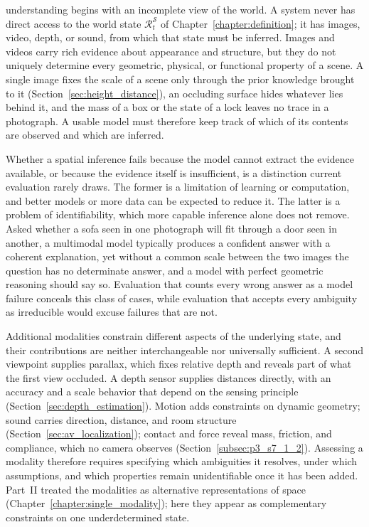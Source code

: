  understanding begins with an incomplete view of the world.
A system never has direct access to the world state $\mathcal{R}^{\mathcal{S}}_t$ of Chapter~\ref{chapter:definition}; it has images, video, depth, or sound, from which that state must be inferred.
Images and videos carry rich evidence about appearance and structure, but they do not uniquely determine every geometric, physical, or functional property of a scene.
A single image fixes the scale of a scene only through the prior knowledge brought to it (Section~\ref{sec:height_distance}), an occluding surface hides whatever lies behind it, and the mass of a box or the state of a lock leaves no trace in a photograph.
A usable model must therefore keep track of which of its contents are observed and which are inferred.

Whether a spatial inference fails because the model cannot extract the evidence available, or because the evidence itself is insufficient, is a distinction current evaluation rarely draws.
The former is a limitation of learning or computation, and better models or more data can be expected to reduce it.
The latter is a problem of identifiability, which more capable inference alone does not remove.
Asked whether a sofa seen in one photograph will fit through a door seen in another, a multimodal model typically produces a confident answer with a coherent explanation, yet without a common scale between the two images the question has no determinate answer, and a model with perfect geometric reasoning should say so.
Evaluation that counts every wrong answer as a model failure conceals this class of cases, while evaluation that accepts every ambiguity as irreducible would excuse failures that are not.

Additional modalities constrain different aspects of the underlying state, and their contributions are neither interchangeable nor universally sufficient.
A second viewpoint supplies parallax, which fixes relative depth and reveals part of what the first view occluded.
A depth sensor supplies distances directly, with an accuracy and a scale behavior that depend on the sensing principle (Section~\ref{sec:depth_estimation}).
Motion adds constraints on dynamic geometry; sound carries direction, distance, and room structure (Section~\ref{sec:av_localization}); contact and force reveal mass, friction, and compliance, which no camera observes (Section~\ref{subsec:p3_s7_1_2}).
Assessing a modality therefore requires specifying which ambiguities it resolves, under which assumptions, and which properties remain unidentifiable once it has been added.
Part~II treated the modalities as alternative representations of space (Chapter~\ref{chapter:single_modality}); here they appear as complementary constraints on one underdetermined state.

